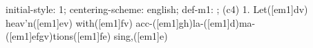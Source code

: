 initial-style: 1;
centering-scheme: english;
def-m1: \grealign;
(c4) 1. Let([em1]dv) heav'n([em1]ev) with([em1]fv) acc-([em1]gh)la-([em1]d)ma-([em1]efgv)tions([em1]fe) sing,([em1]e)